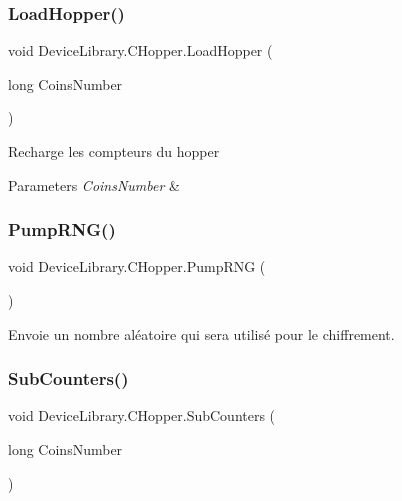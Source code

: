 \subsubsection{\texorpdfstring{Load\+Hopper()}{LoadHopper()}}
{\footnotesize\ttfamily void Device\+Library.\+C\+Hopper.\+Load\+Hopper (\begin{DoxyParamCaption}\item[{long}]{Coins\+Number }\end{DoxyParamCaption})\hspace{0.3cm}{\ttfamily [inline]}}



Recharge les compteurs du hopper 


\begin{DoxyParams}{Parameters}
{\em Coins\+Number} & \\
\hline
\end{DoxyParams}
\mbox{\label{class_device_library_1_1_c_hopper_ad4e3e04686c9cabd002597ebd8fa3712}} 
\subsubsection{\texorpdfstring{Pump\+R\+N\+G()}{PumpRNG()}}
{\footnotesize\ttfamily void Device\+Library.\+C\+Hopper.\+Pump\+R\+NG (\begin{DoxyParamCaption}{ }\end{DoxyParamCaption})\hspace{0.3cm}{\ttfamily [inline]}}



Envoie un nombre aléatoire qui sera utilisé pour le chiffrement. 

\mbox{\label{class_device_library_1_1_c_hopper_a2fa0700c53416b25e7cad3dd626a1753}} 
\subsubsection{\texorpdfstring{Sub\+Counters()}{SubCounters()}}
{\footnotesize\ttfamily void Device\+Library.\+C\+Hopper.\+Sub\+Counters (\begin{DoxyParamCaption}\item[{long}]{Coins\+Number }\end{DoxyParamCaption})\hspace{0.3cm}{\ttfamily [inline]}}



